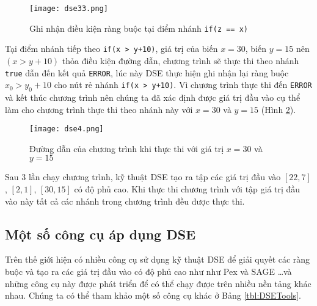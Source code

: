 \begin{figure}[H]
	\caption{Ghi nhận điều kiện ràng buộc tại điểm nhánh \texttt{if(z == x)}}
	\label{fig:dse33}
	\begin{center}
		\texttt{[image: dse33.png]}
	\end{center}
\end{figure}

Tại điểm nhánh tiếp theo \texttt{if(x > y+10)}, giá trị của biến $x = 30 $, biến $ y = 15 $ nên $(x >  y+10)$ thỏa điều kiện đường dẫn, chương trình sẽ thực thi theo nhánh \texttt{true} dẫn đến kết quả \texttt{ERROR}, lúc này DSE thực hiện ghi nhận lại ràng buộc $ x_{0} > y_{0}+ 10 $ cho nút rẻ nhánh \texttt{if(x > y+10)}. Vì chương trình thực thi đến \texttt{ERROR} và kết thúc chương trình nên chúng ta đã xác định được giá trị đầu vào cụ thể làm cho chương trình thực thi theo nhánh này với $x = 30$ và $y = 15$ (Hình \ref{fig:dse4}).

\begin{figure}[H]
	\caption{Đường dẫn của chương trình khi thực thi với giá trị $x = 30$ và $y = 15$}
	\label{fig:dse4}
	\begin{center}
		\texttt{[image: dse4.png]}
	\end{center}	
\end{figure}

Sau 3 lần chạy chương trình, kỹ thuật DSE tạo ra tập các giá trị đầu vào $ [22,7] $, $ [2,1] $, $ [30,15] $ có độ phủ cao. Khi thực thi chương trình với tập giá trị đầu vào này tất cả các nhánh trong chương trình đều được thực thi. 
	
\subsection{Một số công cụ áp dụng DSE}	

Trên thế giới hiện có nhiều công cụ sử dụng kỹ thuật DSE để giải quyết
các ràng buộc và tạo ra các giá trị đầu vào có độ phủ cao như như Pex
\cite{tillmann2008pex} và SAGE \cite{godefroid2008automated}\dots và
những công cụ này được phát triển để có thể chạy được trên nhiều nền
tảng khác nhau. Chúng ta có thể tham khảo một số công cụ khác ở Bảng \ref{tbl:DSETools}.
		
